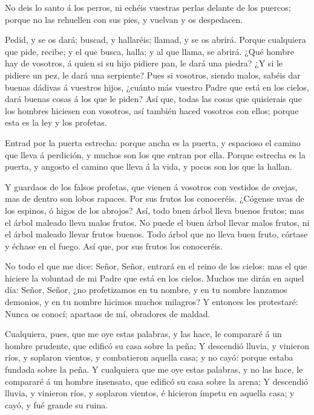  No deis lo santo á los perros, ni echéis vuestras perlas
delante de los puercos; porque no las rehuellen con sus pies, y vuelvan
y os despedacen.

 Pedid, y se os dará; buscad, y hallaréis; llamad, y se os
abrirá.  Porque cualquiera que pide, recibe; y el que busca,
halla; y al que llama, se abrirá.  ¿Qué hombre hay de
vosotros, á quien si su hijo pidiere pan, le dará una piedra?
 ¿Y si le pidiere un pez, le dará una serpiente?
 Pues si vosotros, siendo malos, sabéis dar buenas dádivas
á vuestros hijos, ¿cuánto más vuestro Padre que está en los cielos, dará
buenas cosas á los que le piden?  Así que, todas las cosas
que quisierais que los hombres hiciesen con vosotros, así también haced
vosotros con ellos; porque esta es la ley y los profetas.

 Entrad por la puerta estrecha: porque ancha es la puerta,
y espacioso el camino que lleva á perdición, y muchos son los que entran
por ella.  Porque estrecha es la puerta, y angosto el
camino que lleva á la vida, y pocos son los que la hallan.

 Y guardaos de los falsos profetas, que vienen á vosotros
con vestidos de ovejas, mas de dentro son lobos rapaces. 
Por sus frutos los conoceréis. ¿Cógense uvas de los espinos, ó higos de
los abrojos?  Así, todo buen árbol lleva buenos frutos; mas
el árbol maleado lleva malos frutos.  No puede el buen
árbol llevar malos frutos, ni el árbol maleado llevar frutos buenos.
 Todo árbol que no lleva buen fruto, córtase y échase en el
fuego.  Así que, por sus frutos los conoceréis.

 No todo el que me dice: Señor, Señor, entrará en el reino
de los cielos: mas el que hiciere la voluntad de mi Padre que está en
los cielos.  Muchos me dirán en aquel día: Señor, Señor,
¿no profetizamos en tu nombre, y en tu nombre lanzamos demonios, y en tu
nombre hicimos muchos milagros?  Y entonces les protestaré:
Nunca os conocí; apartaos de mí, obradores de maldad.

 Cualquiera, pues, que me oye estas palabras, y las hace,
le compararé á un hombre prudente, que edificó su casa sobre la peña;
 Y descendió lluvia, y vinieron ríos, y soplaron vientos, y
combatieron aquella casa; y no cayó: porque estaba fundada sobre la
peña.  Y cualquiera que me oye estas palabras, y no las
hace, le compararé á un hombre insensato, que edificó su casa sobre la
arena;  Y descendió lluvia, y vinieron ríos, y soplaron
vientos, é hicieron ímpetu en aquella casa; y cayó, y fué grande su
ruina.

